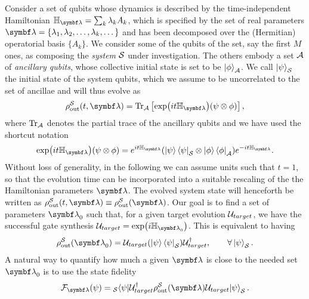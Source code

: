 Consider a set of qubits whose dynamics is described by the time-independent Hamiltonian $\HH_\bslambda=\sum_k \lambda_k A_k$, which is specified by the set of real parameters $\bslambda=\{\lambda_1,\lambda_2,\dots,\lambda_k,\dots\}$ and has been decomposed over the (Hermitian) operatorial basis $\{A_k\}$.
We consider some of the qubits of the set, say the first $M$ ones, as composing the \emph{system} ${\cal S}$ under investigation. The others embody a set  ${\cal A}$ of \emph{ancillary qubits}, whose collective initial state is set to be $\ket{\phi}_{\cal A}$.
We call $\ket\psi_{\cal S}$ the initial state of the system qubits, which we assume to be uncorrelated to the set of ancillae and will thus evolve as
\begin{equation}
	\rho^{\cal S}_{\on{out}}(t, \bslambda) = %
	\Tr_\calA\left[\exp(it\HH_\bslambda)(\psi\otimes\phi)\right],
\end{equation}
where $\Tr_{\mathcal{A}}$ denotes the partial trace of the ancillary qubits and we have used the shortcut notation
\begin{equation}
\exp(it\HH_\bslambda)(\psi\otimes\phi)=e^{it\HH_\bslambda}(\ket{\psi}\bra{\psi}_{\cal S}\otimes\ket{\phi}\bra{\phi}_{\cal A})e^{-it\HH_\bslambda}.
\end{equation}
Without loss of generality, in the following we can assume units such that $t=1$, so that the evolution time can be incorporated into a suitable rescaling of the the Hamiltonian parameters $\bslambda$. The evolved system state will henceforth be written as $\rho^{\cal S}_{\on{out}}(t,\bslambda)\equiv \rho^{\cal S}_{\on{out}}(\bslambda)$. Our goal is to find a set of parameters $\bslambda_0$ such that, for a given target evolution ${{\mathcal{U}}_{target}}$, we have the successful gate synthesis $\Utarget=\exp(i\HH_{\bslambda_0})$.
This is equivalent to having
\begin{equation}
	\rho^{\cal S}_{\on{out}}(\bslambda_0) =
	\Utarget(\ket{\psi}\bra{\psi}_{\cal S})\calU^\dagger_{target},\qquad \forall\ket{\psi}_{\cal S}.
\end{equation}
A natural way to quantify how much a given $\bslambda$ is close to the needed set $\bslambda_0$ is to use the state fidelity %
\begin{equation}
	\calF_\bslambda(\psi) ={}_{\cal S}\!\mel{\psi}{\calU_{target}^\dagger \rho_{\on{out}}^{\calS}(\bslambda) \Utarget}{\psi}_{\cal S}.
	\label{eq:fidelity_definition}
\end{equation}

